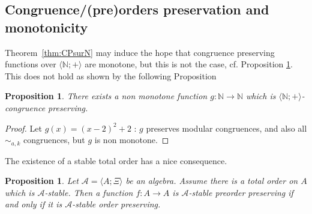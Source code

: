 \documentclass[11pt,a4paper]{article}
\newtheorem{proposition}[theorem]{Proposition}
\newtheorem{corollary}[theorem]{Corollary}
\theoremstyle{definition} %
\newcommand\+[1]{\mathcal{#1}} %
\newcommand{\N}{{\mathbb N}}     %
\begin{document}
%
%
%
\subsection{Congruence/(pre)orders preservation and monotonicity}\label{ss cong preorder preservation and monotony}

Theorem~\ref{thm:CPsurN} may induce the hope that  congruence preserving functions   over $\langle\N;+\rangle$ are  monotone, but this is not the case, cf. Proposition \ref{p:cp non monotone}. This does not hold as shown by the following Proposition
%
\begin{proposition}\label{p:cp non monotone}
 There exists a non  monotone function $g:\N\to\N$
which is $\langle\N;+\rangle$-congruence preserving.
\end{proposition}
%
\begin{proof}
Let $g(x)=(x-2)^2+2$ : $g$ preserves modular congruences, and also all $\sim_{a,k}$ congruences, but $g$ is non monotone.
\end{proof}

The existence of a stable total order  has a nice consequence.

\begin{proposition}\label{p:stable total order}
Let $\+A = \langle A;\Xi\rangle$ be an algebra.
Assume there is a total order on $A$ which is $\+A$-stable.
Then a function $f:A\to A$ is $\+A$-stable preorder preserving 
if and only if it is $\+A$-stable order preserving.
\end{proposition}
\end{document}

